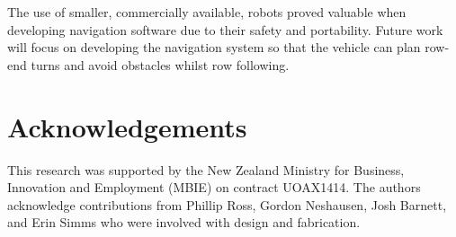 \documentclass[preprint,authoryear,12pt]{elsarticle}
\begin{document}
    The use of smaller, commercially available, robots proved valuable when developing navigation software due to their safety and portability.
    Future work will focus on developing the navigation system so that the vehicle can plan row-end turns and avoid obstacles whilst row following.


\section*{Acknowledgements}
This research was supported by the New Zealand Ministry for Business, Innovation and Employment (MBIE) on contract UOAX1414.
The authors acknowledge contributions from Phillip Ross, Gordon Neshausen, Josh Barnett, and Erin Simms who were involved with design and fabrication.



\end{document}
